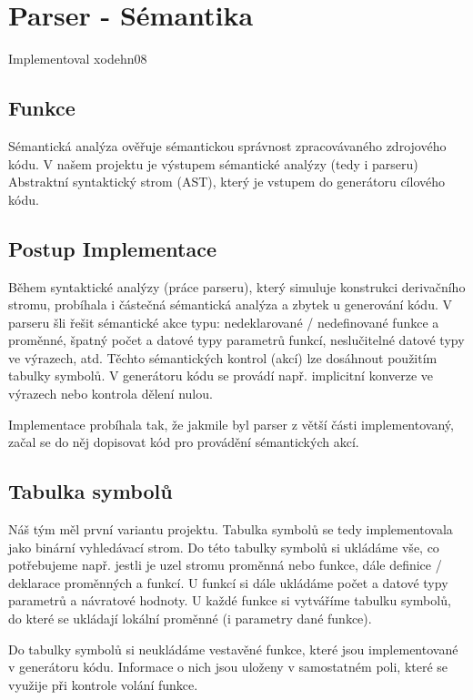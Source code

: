 \documentclass[11pt,a4paper]{article}
\begin{document}
    \newpage



\section{Parser - Sémantika} \label{semantika}
    Implementoval xodehn08

    \subsection{Funkce}
    Sémantická analýza ověřuje sémantickou správnost zpracovávaného zdrojového kódu. V našem projektu je výstupem sémantické analýzy (tedy i parseru) Abstraktní syntaktický strom (AST), který je vstupem do generátoru cílového kódu.

    \subsection{Postup Implementace}
    Během syntaktické analýzy (práce parseru), který simuluje konstrukci derivačního stromu, probíhala i částečná sémantická analýza a zbytek u generování kódu. V parseru šli řešit sémantické akce typu: nedeklarované / nedefinované funkce a proměnné, špatný počet a datové typy parametrů funkcí, neslučitelné datové typy ve výrazech, atd. Těchto sémantických kontrol (akcí) lze dosáhnout použitím tabulky symbolů. V generátoru kódu se provádí např. implicitní konverze ve výrazech nebo kontrola dělení nulou.

    Implementace probíhala tak, že jakmile byl parser z větší části implementovaný, začal se do něj dopisovat kód pro provádění sémantických akcí.

    \subsection{Tabulka symbolů}
    Náš tým měl první variantu projektu. Tabulka symbolů se tedy implementovala jako binární vyhledávací strom. Do této tabulky symbolů si ukládáme vše, co potřebujeme např. jestli je uzel stromu proměnná nebo funkce, dále definice / deklarace proměnných a funkcí. U funkcí si dále ukládáme počet a datové typy parametrů a návratové hodnoty. U každé funkce si vytváříme  tabulku symbolů, do které se ukládají lokální proměnné (i parametry dané funkce).

    Do tabulky symbolů si neukládáme vestavěné funkce, které jsou implementované v generátoru kódu. Informace o nich jsou uloženy v samostatném poli, které se využije při kontrole volání funkce.
\end{document}

